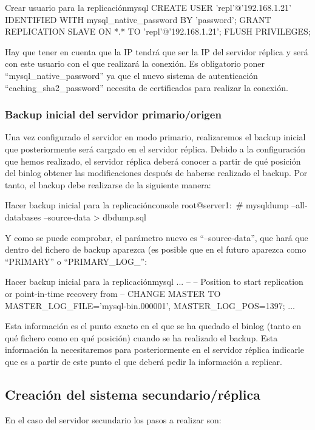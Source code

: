 \begin{mycode}{Crear usuario para la replicación}{mysql}{{\footnotesize }}
CREATE USER 'repl'@'192.168.1.21' IDENTIFIED WITH mysql_native_password BY 'password';
GRANT REPLICATION SLAVE ON *.* TO 'repl'@'192.168.1.21';
FLUSH PRIVILEGES;
\end{mycode}


Hay que tener en cuenta que la IP tendrá que ser la IP del servidor réplica y será con este usuario con el que realizará la conexión. Es obligatorio poner “mysql\_native\_password” ya que el nuevo sistema de autenticación “caching\_sha2\_password” necesita de certificados para realizar la conexión.


\subsubsection{Backup inicial del servidor primario/origen}
Una vez configurado el servidor en modo primario, realizaremos el backup inicial que posteriormente será cargado en el servidor réplica. Debido a la configuración que hemos realizado, el servidor réplica deberá conocer a partir de qué posición del binlog obtener las modificaciones después de haberse realizado el backup. Por tanto, el backup debe realizarse de la siguiente manera:

\begin{mycode}{Hacer backup inicial para la replicación}{console}{}
root@server1:~# mysqldump --all-databases --source-data > dbdump.sql
\end{mycode}

Y como se puede comprobar, el parámetro nuevo es “--source-data”, que hará que dentro del fichero de backup aparezca (es posible que en el futuro aparezca como “PRIMARY” o “PRIMARY\_LOG\_”:


\begin{mycode}{Hacer backup inicial para la replicación}{mysql}{{\small }}
...
--
-- Position to start replication or point-in-time recovery from
--
CHANGE MASTER TO MASTER_LOG_FILE='mysql-bin.000001', MASTER_LOG_POS=1397;
...
\end{mycode}

Esta información es el punto exacto en el que se ha quedado el binlog (tanto en qué fichero como en qué posición) cuando se ha realizado el backup. Esta información la necesitaremos para posteriormente en el servidor réplica indicarle que es a partir de este punto el que deberá pedir la información a replicar.


\subsection{Creación del sistema secundario/réplica}
En el caso del servidor secundario los pasos a realizar son:

